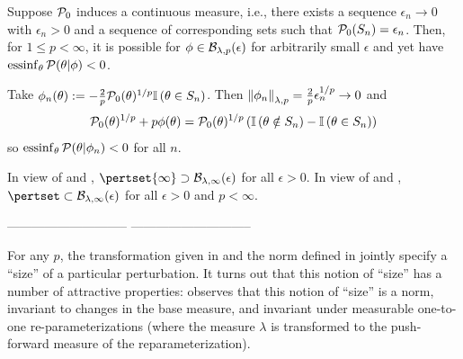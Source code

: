 \begin{ex}
%
Suppose $\mathcal{P}_{0}$ induces a continuous measure, i.e., there exists a sequence
$\epsilon_n \rightarrow 0$ with $\epsilon_n > 0$ and a sequence of corresponding
sets such that $\mathcal{P}_{0}(S_n) = \epsilon_n$.  Then, for $1 \le p < \infty$, it is
possible for $\phi \in \mathcal{B}_{\lambda,p}(\epsilon)$ for arbitrarily small
$\epsilon$ and yet have $\operatorname*{\mathrm{essinf}}_{\theta} \mathcal{P}(\theta \vert \phi) < 0$.

Take
%
%
$\phi_n(\theta) := - \frac{2}{p} \mathcal{P}_{0}(\theta)^{1/p} \mathbb{I}\left(\theta \in S_n\right)$.
%
%
Then $\left\Vert\phi_n\right\Vert_{\lambda, p} = \frac{2}{p} \epsilon_n^{1/p} \rightarrow 0$
and
%
\begin{align*}
%
\pbase(\theta)^{1/p} + p \phi(\theta) ={}
\pbase(\theta)^{1/p}
\left(\ind{\theta \notin S_n} - \ind{\theta \in S_n} \right)
%
\end{align*}
%
so $\operatorname*{\mathrm{essinf}}_\theta \mathcal{P}(\theta \vert \phi_n) < 0$ for all $n$.
%
\end{ex}

In view of  and ,
$\pertset{\infty} \supset \ball_{\lambda,\infty}(\epsilon)$ for all $\epsilon >
0$. In view of  and , $\pertset
\subset \ball_{\lambda,\infty}(\epsilon)$ for all $\epsilon > 0$ and $p <
\infty$.


-----------------------------
-----------------------------


For any $p$, the transformation given in  and the norm
defined in  jointly specify a ``size'' of a particular
perturbation.   It turns out that this notion of ``size'' has a number of
attractive properties: \citep[Result 2]{gustafson:1996:local} observes that this
notion of ``size'' is a norm, invariant to changes in the base measure, and
invariant under measurable one-to-one re-parameterizations (where the measure
$\lambda$ is transformed to the push-forward measure of the reparameterization).

